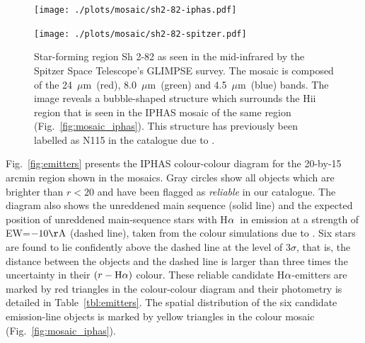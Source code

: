 \documentclass[useAMS,usenatbib]{mn2e}
\def\ha{\mbox{H$\rm \alpha$}}
\def\micron{\mbox{$\mu$m}}
\begin{document}
\begin{figure}
    \begin{minipage}[b]{0.8\linewidth}
        \texttt{[image: ./plots/mosaic/sh2-82-iphas.pdf]} 
    \end{minipage}
\caption{IPHAS-based mosaic of H{\sc ii} region Sh 2-82,
composed of \ha\ (red channel), $r$ (green channel) and $i$ (blue channel). Yellow triangles show the position of candidate \ha-emitters
which have been selected from the colour-colour diagram
in Fig.~\ref{fig:emitters}. Note that the H{\sc ii} region is surrounded by a faint blue/green reflection nebula
and dark cloud filaments.}
\label{fig:mosaic_iphas}
    \begin{minipage}[b]{0.8\linewidth}
        \texttt{[image: ./plots/mosaic/sh2-82-spitzer.pdf]} 
    \end{minipage}
    \caption{Star-forming region Sh 2-82 as seen in the mid-infrared
    by the Spitzer Space Telescope's GLIMPSE survey. The mosaic is composed of the 24~\micron\ (red), 8.0~\micron\ (green) and 4.5~\micron\ (blue) bands.
    The image reveals a bubble-shaped structure which surrounds the {\sc Hii} region that is seen in the IPHAS mosaic of the same region (Fig.~\ref{fig:mosaic_iphas}). 
    This structure has previously been labelled as N115 in the 
catalogue due to \citet{Churchwell2006}.}
    \label{fig:mosaic_spitzer}
\end{figure}

Fig.~\ref{fig:emitters} presents
the IPHAS colour-colour diagram for 
the 20-by-15 arcmin region shown in the mosaics.
Gray circles show all objects
which are brighter than $r<20$
and have been flagged as \emph{reliable}
in our catalogue.
The diagram also shows the unreddened main sequence (solid line)
and the expected position of unreddened main-sequence stars
with \ha\ in emission
at a strength of EW=$-10{\rm \AA}$ (dashed line),
taken from the colour simulations due to \citet{Barentsen2011a}.
Six stars are found to lie confidently above the 
dashed line at the level of $3\sigma$,
that is, the distance between the objects and the dashed line
is larger than three times the uncertainty
in their $(r-\ha)$ colour.
These reliable candidate \ha-emitters
are marked by red triangles in the colour-colour diagram
and their photometry is detailed in Table~\ref{tbl:emitters}.
The spatial distribution of the six candidate emission-line objects
is marked by yellow triangles in the colour mosaic (Fig.~\ref{fig:mosaic_iphas}).
\end{document}
